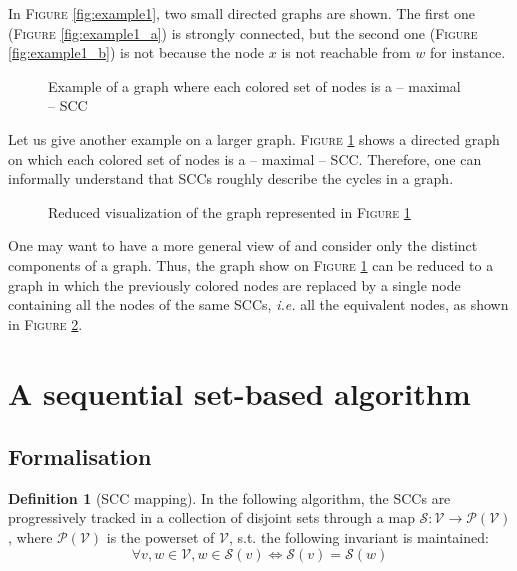 \documentclass[a4 paper, 12pt]{article}
\theoremstyle{definition}
\def\VV{\ensuremath{\mathcal{V}}}
\newtheorem{definition}{Definition}
\begin{document}
In \textsc{Figure} \ref{fig:example1}, two small directed graphs are shown. The first one (\textsc{Figure} \ref{fig:example1_a}) is strongly connected, but the second one (\textsc{Figure} \ref{fig:example1_b}) is not because the node $x$ is not reachable from $w$ for instance.

\begin{figure}[!h]
    \caption{Example of a graph where each colored set of nodes is a -- maximal -- SCC\label{fig:exampleSCC}}
\end{figure}

Let us give another example on a larger graph. \textsc{Figure} \ref{fig:exampleSCC} shows a directed graph on which each colored set of nodes is a -- maximal -- SCC. Therefore, one can informally understand that SCCs roughly describe the cycles in a graph.

\begin{figure}[!h]
    \caption{Reduced visualization of the graph represented in \textsc{Figure} \ref{fig:exampleSCC}}\label{fig:exampleSCCreduced}
\end{figure}

One may want to have a more general view of and consider only the distinct components of a graph. Thus, the graph show on \textsc{Figure} \ref{fig:exampleSCC} can be reduced to a graph in which the previously colored nodes are replaced by a single node containing all the nodes of the same SCCs, \textit{i.e.} all the equivalent nodes, as shown in \textsc{Figure} \ref{fig:exampleSCCreduced}.



\section{A sequential set-based algorithm}
\subsection{Formalisation}
\begin{definition}[SCC mapping]
    In the following algorithm, the SCCs are progressively tracked in a collection of disjoint sets through a map $\mathcal{S} : \mathcal{V} \longrightarrow \mathcal{P}(\mathcal{V})$, where $\mathcal{P}(\mathcal{V})$ is the powerset of \VV, s.t. the following invariant is maintained:
    \begin{equation}\label{invariant:Sdisjoint}
        \forall v, w \in \mathcal{V}, w\in \mathcal{S}(v) \Longleftrightarrow \mathcal{S}(v) = \mathcal{S}(w)
    \end{equation}
\end{definition}
\end{document}
